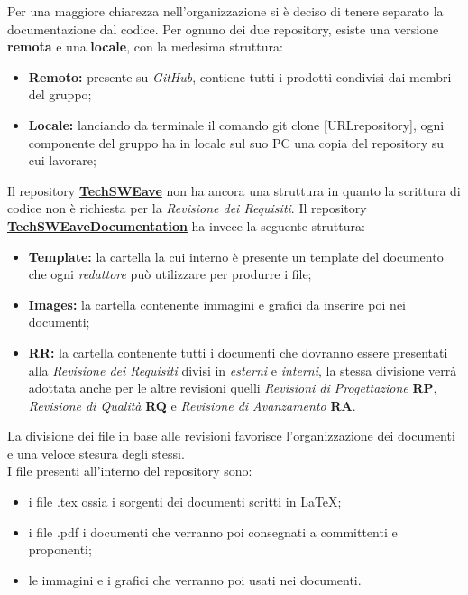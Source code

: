         Per una maggiore chiarezza nell'organizzazione si è deciso di tenere separato la documentazione dal codice.
        Per ognuno dei due repository, esiste una versione \textbf{remota} e una \textbf{locale}, con la medesima struttura: 
        \begin{itemize}
            \item \textbf{Remoto:} presente su \textit{GitHub}, contiene tutti i prodotti condivisi dai membri del gruppo;
            \item \textbf{Locale:} lanciando da terminale il comando {\selectfont git clone [URLrepository]}, ogni componente del gruppo ha in locale sul suo PC una copia del repository su cui lavorare;
        \end{itemize} 
        Il repository \textbf{\href{https://github.com/techsweave/TechSWEave.git}{TechSWEave}} non ha ancora una struttura in quanto la scrittura di codice non è richiesta per la \textit{Revisione dei Requisiti}. 
        Il repository  \textbf{\href{https://github.com/techsweave/TechSWEaveDocumentation.git}{TechSWEaveDocumentation}} ha invece la seguente struttura:
        \begin{itemize}
            \item \textbf{Template:} la cartella la cui interno è presente un template del documento che ogni \textit{redattore} può utilizzare per produrre i file;
            \item \textbf{Images:} la cartella contenente immagini e grafici da inserire poi nei documenti;
            \item \textbf{RR:} la cartella contenente tutti i documenti che dovranno essere presentati alla \textit{Revisione dei Requisiti} divisi in \textit{esterni} e \textit{interni}, la stessa divisione verrà adottata anche per le altre revisioni quelli \textit{Revisioni di Progettazione} \textbf{RP}, \textit{Revisione di Qualità} \textbf{RQ} e \textit{Revisione di Avanzamento} \textbf{RA}.
        \end{itemize}
        La divisione dei file in base alle revisioni favorisce l'organizzazione dei documenti e una veloce stesura degli stessi.\\
        I file presenti all'interno del repository sono:
        \begin{itemize}
            \item i file {\selectfont .tex} ossia i sorgenti dei documenti scritti in \LaTeX;
            \item i file {\selectfont .pdf} i documenti che verranno poi consegnati a committenti e proponenti;
            \item le immagini e i grafici che verranno poi usati nei documenti.
        \end{itemize}
